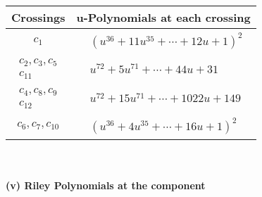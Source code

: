 \documentclass[1p]{elsarticle_modified}
\theoremstyle{definition}
\begin{document}
\begin{tabular}{m{50pt}|m{274pt}}
Crossings & \hspace{64pt}u-Polynomials at each crossing \\
\hline $$\begin{aligned}c_{1}\end{aligned}$$&$\begin{aligned}
&(u^{36}+11 u^{35}+\cdots+12 u+1)^{2}
\end{aligned}$\\
\hline $$\begin{aligned}c_{2},c_{3},c_{5}\\c_{11}\end{aligned}$$&$\begin{aligned}
&u^{72}+5 u^{71}+\cdots+44 u+31
\end{aligned}$\\
\hline $$\begin{aligned}c_{4},c_{8},c_{9}\\c_{12}\end{aligned}$$&$\begin{aligned}
&u^{72}+15 u^{71}+\cdots+1022 u+149
\end{aligned}$\\
\hline $$\begin{aligned}c_{6},c_{7},c_{10}\end{aligned}$$&$\begin{aligned}
&(u^{36}+4 u^{35}+\cdots+16 u+1)^{2}
\end{aligned}$\\
\hline
\end{tabular}\\~\\
\newpage\renewcommand{\arraystretch}{1}
\flushleft \textbf{(v) Riley Polynomials at the component}\newline \\
\end{document}
